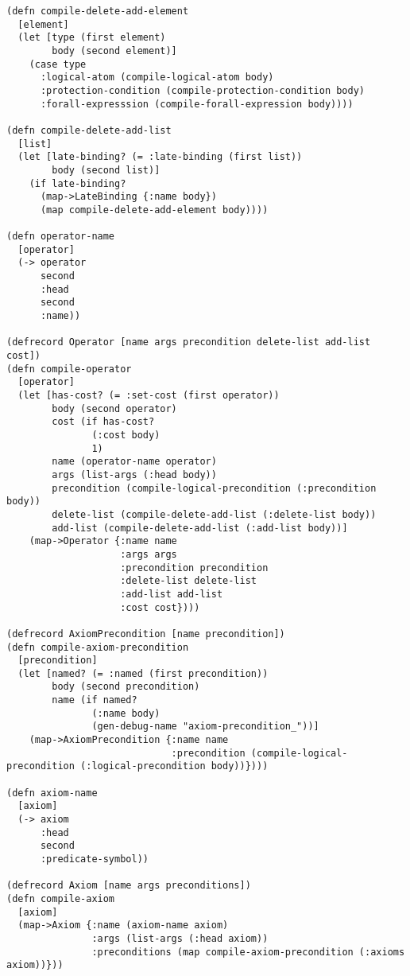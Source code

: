 \begin{lstlisting}
(defn compile-delete-add-element
  [element]
  (let [type (first element)
        body (second element)]
    (case type
      :logical-atom (compile-logical-atom body)
      :protection-condition (compile-protection-condition body)
      :forall-expresssion (compile-forall-expression body))))

(defn compile-delete-add-list
  [list]
  (let [late-binding? (= :late-binding (first list))
        body (second list)]
    (if late-binding?
      (map->LateBinding {:name body})
      (map compile-delete-add-element body))))

(defn operator-name
  [operator]
  (-> operator
      second
      :head
      second
      :name))

(defrecord Operator [name args precondition delete-list add-list cost])
(defn compile-operator
  [operator]
  (let [has-cost? (= :set-cost (first operator))
        body (second operator)
        cost (if has-cost?
               (:cost body)
               1)
        name (operator-name operator)
        args (list-args (:head body))
        precondition (compile-logical-precondition (:precondition body))
        delete-list (compile-delete-add-list (:delete-list body))
        add-list (compile-delete-add-list (:add-list body))]
    (map->Operator {:name name
                    :args args
                    :precondition precondition
                    :delete-list delete-list
                    :add-list add-list
                    :cost cost})))

(defrecord AxiomPrecondition [name precondition])
(defn compile-axiom-precondition
  [precondition]
  (let [named? (= :named (first precondition))
        body (second precondition)
        name (if named?
               (:name body)
               (gen-debug-name "axiom-precondition_"))]
    (map->AxiomPrecondition {:name name
                             :precondition (compile-logical-precondition (:logical-precondition body))})))

(defn axiom-name
  [axiom]
  (-> axiom
      :head
      second
      :predicate-symbol))

(defrecord Axiom [name args preconditions])
(defn compile-axiom
  [axiom]
  (map->Axiom {:name (axiom-name axiom)
               :args (list-args (:head axiom))
               :preconditions (map compile-axiom-precondition (:axioms axiom))}))



\end{lstlisting}
